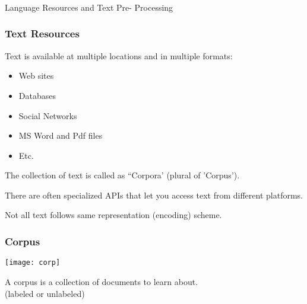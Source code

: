 \begin{frame}[fragile]\frametitle{}

\begin{center}
{\Large Language Resources and Text Pre- Processing}
\end{center}
\end{frame}

\begin{frame}[fragile]\frametitle{Text Resources}
Text is available at multiple locations and in multiple formats:
\begin{itemize}
\item Web sites
\item Databases
\item Social Networks
\item MS Word and Pdf files
\item Etc. 
\end{itemize}
The collection of text is called as ``Corpora' (plural of 'Corpus').

There are often specialized APIs that let you access text from different platforms.

Not all text follows same representation (encoding) scheme.
\end{frame}


\begin{frame}[fragile]\frametitle{Corpus}
\begin{center}
\texttt{[image: corp]}
\end{center}
A corpus is a collection of documents to learn about.\\
(labeled or unlabeled)
\end{frame}


